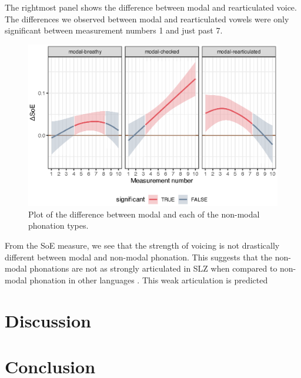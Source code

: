 The rightmost panel shows the difference between modal and rearticulated voice. The differences we observed between modal and rearticulated vowels were only significant between measurement numbers 1 and just past 7. 

\begin{figure}[h!]
    \centering
    \includegraphics[width = \linewidth]{images/LCH_GAMMs/soe_model_diff.eps}
    \caption{Plot of the difference between modal and each of the non-modal phonation types.}
    \label{fig:soe_model_diff}
\end{figure}

From the SoE measure, we see that the strength of voicing is not drastically different between modal and non-modal phonation. This suggests that the non-modal phonations are not as strongly articulated in SLZ when compared to non-modal phonation in other languages \citep[e.g.,][]{garellekVoicingGlottalConsonants2021,garellekMarginsPhonologyPhonetics2025,wellerInteractionsToneGlottalization2023,wellerLexicalToneVowel2023,wellerVoiceQualityTone2024}. This weak articulation is predicted 

\section{Discussion}\label{sec:discussion_of_lc}

\citet{humbertConsonantTypesVowel1978} 


\section{Conclusion}\label{sec:conclusion_of_lc}
